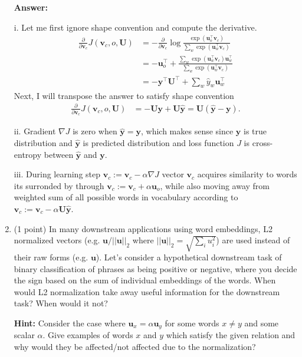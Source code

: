 \documentclass{article}
\newenvironment{answer}{
    {\bf Answer:} \sf \begingroup\color{red}
}{\endgroup}%
\begin{document}
\begin{enumerate}[label=(\alph*)]
\begin{enumerate}[label=(\roman*)]
\end{enumerate}

\begin{shaded}
\begin{answer}
i. Let me first ignore shape convention and compute the derivative.
\begin{align}
	\frac{\partial }{\partial \bm v_c} J(\bm v_c, o, \bm U)
	&= -\frac{\partial }{\partial \bm v_c} \log \frac{\exp(\bm u_{o}^\top \bm v_c)}{\sum_{w} \exp(\bm u_{w}^\top \bm v_c)} \\
	&= -\bm u_{o}^\top +  \frac{\sum_{w} \exp(\bm u_{w}^\top \bm v_c) \bm u_{w}^\top}{\sum_{w} \exp(\bm u_{w}^\top \bm v_c)} \\
	&= -\bm y^\top \bm U^\top + \sum_w \hat{y}_w \bm u_{w}^\top 
\end{align}
Next, I will transpose the answer to satisfy shape convention
\begin{align}
	\frac{\partial }{\partial \bm v_c} J(\bm v_c, o, \bm U)
	&= -\bm U \bm y + \bm U \hat{\bm y}
	= \bm U \left( \hat{\bm y} - \bm y \right).
\end{align}

ii. Gradient $\nabla J$ is zero when $\hat{\bm y} = \bm y$, which makes sense since $\bm y$ is true distribution and $\hat{\bm y}$ is predicted distribution and loss function $J$ is cross-entropy between $\hat{\bm y}$ and $\bm y$.

iii. During learning step $\bm v_c := \bm v_c - \alpha \nabla J$ vector $\bm v_c$ acquires similarity to words its surronded by through $\bm v_c := \bm v_c + \alpha \bm u_o$, while also moving away from weighted sum of all possible words in vocabulary according to $\bm v_c := \bm v_c - \alpha \bm U \hat{\bm y}$.
\end{answer}
\end{shaded}


\item (1 point) In many downstream applications using word embeddings, L2 normalized vectors (e.g. $\mathbf{u}/||\mathbf{u}||_2$ where $||\mathbf{u}||_2 = \sqrt{\sum_i u_i^2}$) are used instead of their raw forms (e.g. $\mathbf{u}$). Let’s consider a hypothetical downstream task of binary classification of phrases as being positive or negative, where you decide the sign based on the sum of individual embeddings of the words. When would L2 normalization take away useful information for the downstream task? When would it not?

\textbf{Hint:} Consider the case where $\mathbf{u}_x = \alpha\mathbf{u}_y$ for some words $x \neq y$ and some scalar $\alpha$. Give examples of words $x$ and $y$ which satisfy the given relation and why would they be affected/not affected due to the normalization?


\end{enumerate}
\end{document}
